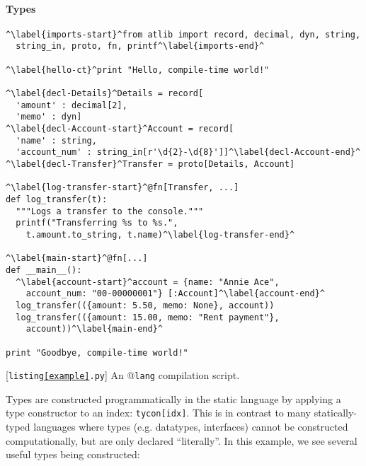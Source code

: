 \documentclass[9pt,preprint]{sigplanconf}
\newcommand{\lstinlinep}[1]{\lstinline[language=Python,basicstyle=\ttfamily\small]{#1}}
\begin{document}
\paragraph{Types}
\begin{codelisting}[t]
\begin{lstlisting}
^\label{imports-start}^from atlib import record, decimal, dyn, string, 
  string_in, proto, fn, printf^\label{imports-end}^

^\label{hello-ct}^print "Hello, compile-time world!"

^\label{decl-Details}^Details = record[
  'amount' : decimal[2], 
  'memo' : dyn]
^\label{decl-Account-start}^Account = record[
  'name' : string, 
  'account_num' : string_in[r'\d{2}-\d{8}']]^\label{decl-Account-end}^
^\label{decl-Transfer}^Transfer = proto[Details, Account]

^\label{log-transfer-start}^@fn[Transfer, ...]
def log_transfer(t):
  """Logs a transfer to the console."""
  printf("Transferring %s to %s.", 
    t.amount.to_string, t.name)^\label{log-transfer-end}^

^\label{main-start}^@fn[...]
def __main__():
  ^\label{account-start}^account = {name: "Annie Ace", 
    account_num: "00-00000001"} [:Account]^\label{account-end}^
  log_transfer(({amount: 5.50, memo: None}, account))
  log_transfer(({amount: 15.00, memo: "Rent payment"}, 
    account))^\label{main-end}^
  
print "Goodbye, compile-time world!"
\end{lstlisting}
\caption{[\texttt{listing\ref{example}.py}] An @\texttt{lang} compilation script.}
\label{example}
\end{codelisting}
Types are constructed programmatically in the static language by applying a type constructor to an index:  \lstinlinep{tycon[idx]}. This is in contrast to many statically-typed languages where types (e.g. datatypes, interfaces) cannot be constructed computationally, but are only declared ``literally''. %
In this example, we see several useful types being constructed:
\end{document}
